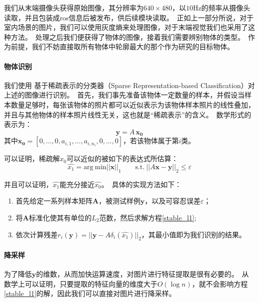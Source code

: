 我们从末端摄像头获得原始图像，其分辨率为$640\times480$，以$10$Hz的频率从摄像头读取，并且包装成ros信息后被发布，供后续模块读取。\ 正如上一部分所说，对于室内场景的图片，我们可以使用灰度熵来处理图像，对于末端视觉我们也采用了这种方法。\ 处理之后我们便获得了物体的图像，接着我们需要辨别物体的类型。\ 作为前提，我们不妨直接取所有物体中轮廓最大的那个作为研究的目标物体。\ 

\paragraph{物体识别}

我们使用 基于稀疏表示的分类器（Sparse Representation-based Classification）对上述的图像进行识别。\ 首先，我们事先准备该物体一定数量的样本，并假设当样本数量足够时，每张该物体的照片都可以近似表示为该物体样本照片的线性叠加，并且与其他物体的样本照片线性无关，这也就是“稀疏表示”的含义。\ 数学形式的表示为：
\begin{equation}
\boldsymbol{y} = A\,\boldsymbol{x_{0}} 
\end{equation}
其中$\boldsymbol{x_{0}} = [0, ..., 0, a_{i, 1}, ..., a_{i, n_{i}}, 0, ..., 0]$，若该物体属于第$i$类。\ 

可以证明\cite{wright2009robust}，稀疏解$x_{0}$可以近似的被如下的表达式所估算：
\begin{equation}
\label{stable_l1}
\hat{x_{1}} = \text{arg}\ \text{min} ||\boldsymbol{x} ||_{1} \qquad\text{s.t.}\: ||A\boldsymbol{x}-\boldsymbol{y}||_{2} \leq \varepsilon 
\end{equation}

并且可以证明，$\hat{x_{1}}$能充分接近$\hat{x_{0}}$。\ 具体的实现方法如下：

\begin{enumerate}
\item 首先给定一系列样本矩阵$\mathbf{A}$，被测试样例$\boldsymbol{y}$，以及可容忍误差$\varepsilon$；
\item 将$\mathbf{A}$标准化使其有单位的$L_2$范数，然后求解方程\eqref{stable_l1};
\item 依次计算残差$r_{i}(\boldsymbol{y}) = ||\boldsymbol{y}-A\delta_{i}(\hat{x_{1}})||_{2}$，其最小值即为我们识别的结果。\ 
\end{enumerate}

\paragraph{降采样}

为了降低$\boldsymbol{y}$的维数，从而加快运算速度，对图片进行特征提取是很有必要的。\ 从数学上可以证明，只要提取的特征向量的维度大于$O( \log n)$，就不会影响方程\eqref{stable_l1}的解，因此我们可以直接对图片进行降采样。\ 

